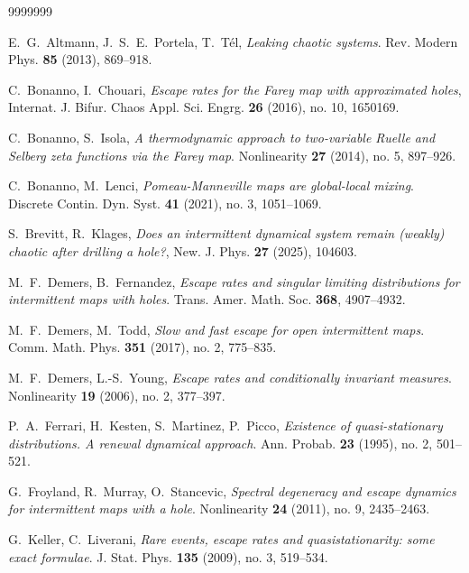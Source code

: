 \documentclass{amsart}
\theoremstyle{definition}
\theoremstyle{remark}
\theoremstyle{definition}
\numberwithin{equation}{section}
\newcommand{\eps}{\varepsilon}
\begin{document}


\begin{thebibliography}{9999999}

 E.~G.~Altmann, J.~S.~E.~Portela, T.~T\'el, \emph{Leaking chaotic systems}. Rev. Modern Phys. \textbf{85} (2013), 869--918.

 C.~Bonanno, I.~Chouari, \emph{Escape rates for the Farey map with approximated holes}, Internat. J. Bifur. Chaos Appl. Sci. Engrg. \textbf{26} (2016), no. 10, 1650169.

 C.~Bonanno, S.~Isola, \emph{A thermodynamic approach to two-variable Ruelle and Selberg zeta functions via the Farey map}. Nonlinearity {\bf 27} (2014), no. 5, 897--926.

 C.~Bonanno, M.~Lenci, \emph{Pomeau-Manneville maps are global-local mixing}. Discrete Contin. Dyn. Syst. \textbf{41} (2021), no. 3, 1051--1069.

 S.~Brevitt, R.~Klages, \emph{Does an intermittent dynamical system remain (weakly) chaotic after drilling a hole?}, New. J. Phys. \textbf{27} (2025), 104603.

 M.~F.~Demers, B.~Fernandez, \emph{Escape rates and singular limiting distributions for intermittent maps with holes}. Trans. Amer. Math. Soc. \textbf{368}, 4907--4932.

 M.~F.~Demers, M.~Todd, \emph{Slow and fast escape for open intermittent maps}. Comm. Math. Phys. \textbf{351} (2017), no. 2, 775--835.

 M.~F.~Demers, L.-S.~Young, \emph{Escape rates and conditionally invariant measures}. Nonlinearity \textbf{19} (2006), no. 2, 377--397.

 P.~A.~Ferrari, H.~Kesten, S.~Martinez, P.~Picco, \emph{Existence of quasi-stationary distributions. A renewal dynamical approach}. Ann. Probab. \textbf{23} (1995), no. 2, 501--521.

 G.~Froyland, R.~Murray, O.~Stancevic, \emph{Spectral degeneracy and escape dynamics for intermittent maps with a hole}. Nonlinearity \textbf{24} (2011), no. 9, 2435--2463.

 G.~Keller, C.~Liverani, \emph{Rare events, escape rates and quasistationarity: some exact formulae}. J. Stat. Phys. \textbf{135} (2009), no. 3, 519--534.


\end{thebibliography}
\end{document}
